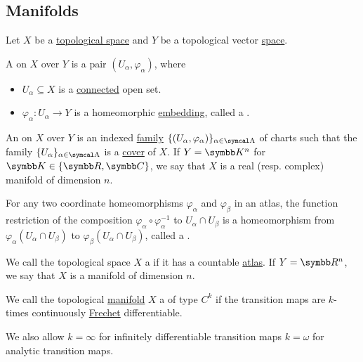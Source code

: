 \subsection{Manifolds}\label{subsec:manifolds}

\begin{definition}\label{def:atlas}\cite[definition 12.1]{Иванов2017}
  Let \( X \) be a \hyperref[def:topological_space]{topological space} and \( Y \) be a topological vector \hyperref[def:topological_vector_space]{space}.

  A  on \( X \) over \( Y \) is a pair \( (U_\alpha, \varphi_\alpha) \), where
  \begin{itemize}
    \item \( U_\alpha \subseteq X \) is a \hyperref[def:connected_space]{connected} open set.
    \item \( \varphi_\alpha: U_\alpha \to Y \) is a homeomorphic \hyperref[def:homeomorphism]{embedding}, called a .
  \end{itemize}

  An  on \( X \) over \( Y \) is an indexed \hyperref[def:indexed_family]{family} \( \{ (U_\alpha, \varphi_\alpha) \}_{\alpha \in \CA} \) of charts such that the family \( \{ U_\alpha \}_{\alpha \in \CA} \) is a \hyperref[def:set_partition]{cover} of \( X \). If \( Y = \BK^n \) for \( \BK \in \{ \BR, \BC \} \), we say that \( X \) is a real (resp. complex) manifold of dimension \( n \).

  For any two coordinate homeomorphisms \( \varphi_\alpha \) and \( \varphi_\beta \) in an atlas, the function restriction of the composition \( \varphi_\alpha \circ \varphi_\alpha^{-1} \) to \( U_\alpha \cap U_\beta \) is a homeomorphism from \( \varphi_\alpha(U_\alpha \cap U_\beta) \) to \( \varphi_\beta(U_\alpha \cap U_\beta) \), called a .
\end{definition}

\begin{definition}\label{def:topological_manifold}\cite[definition 12.4]{Иванов2017}
  We call the topological space \( X \) a  if it has a countable \hyperref[def:atlas]{atlas}. If \( Y = \BR^n \), we say that \( X \) is a manifold of dimension \( n \).
\end{definition}

\begin{definition}\label{def:differentiable_manifold}\cite[definition 12.6]{Иванов2017}
  We call the topological \hyperref[def:topological_manifold]{manifold} \( X \) a  of type \( C^k \) if the transition maps are \( k \)-times continuously \hyperref[def:differentiability/frechet]{Frechet} differentiable.

  We also allow \( k = \infty \) for infinitely differentiable transition maps \( k = \omega \) for analytic transition maps.
\end{definition}
